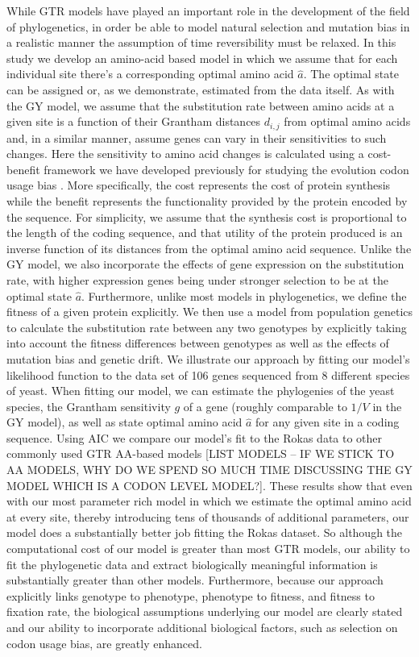 \documentclass[13pt]{article}
\begin{document}
While GTR models have played an important role in the development of the field of phylogenetics,  in order be able to model natural selection and mutation bias in a realistic manner the assumption of time reversibility must be relaxed.
In this study we develop an amino-acid based model in which we assume that for each individual site there's a corresponding optimal amino acid $\hat{a}$.
The optimal state can be assigned or, as we demonstrate, estimated from the data itself.
As with the GY model, we assume that the substitution rate between amino acids at a given site is a function of their Grantham distances $d_{i,j}$ from optimal amino acids and, in a similar manner, assume genes can vary in their sensitivities to such changes.
Here the sensitivity to amino acid changes is calculated using a cost-benefit framework we have developed previously for studying the evolution codon usage bias \cite{Gilchrist07, GilchristEtAl09,ShahAndGilchrist11}.
More specifically, the cost represents the cost of protein synthesis while the benefit represents the functionality provided by the protein encoded by the sequence.
For simplicity, we assume that the synthesis cost is proportional to the length of the coding sequence, and that utility of the protein produced is an inverse function of its distances from the optimal amino acid sequence.
Unlike the GY model, we also incorporate the effects of gene expression on the substitution rate, with higher expression genes being under stronger selection to be at the optimal state $\hat{a}$.
Furthermore, unlike most models in phylogenetics, we define the fitness of a given protein explicitly.
We then use a model from population genetics to calculate the substitution rate between any two genotypes by explicitly taking into account the fitness differences between genotypes as well as the effects of mutation bias and genetic drift.
We illustrate our approach by fitting our model's likelihood function to the \cite{RokasEtAl03} data set of 106 genes sequenced from 8 different species of yeast.
When fitting our model, we can estimate the phylogenies of the yeast species, the Grantham sensitivity $g$ of a gene (roughly comparable to $1/V$ in the GY model), as well as state optimal amino acid $\hat{a}$ for any given site in a coding sequence.
Using AIC we compare our model's fit to the Rokas data to other commonly used GTR AA-based models [LIST MODELS -- IF WE STICK TO AA MODELS, WHY DO WE SPEND SO MUCH TIME DISCUSSING THE GY MODEL WHICH IS A CODON LEVEL MODEL?].
These results show that even with our most parameter rich model in which we estimate the optimal amino acid at every site, thereby introducing tens of thousands of additional parameters, our model does a substantially better job fitting the Rokas dataset.
So although the computational cost of our model is greater than most GTR models,  our ability to fit the phylogenetic data and extract biologically meaningful information is substantially greater than other models.
Furthermore, because our approach explicitly links genotype to phenotype, phenotype to fitness, and fitness to fixation rate, the biological assumptions underlying our model are clearly stated and our ability to incorporate additional biological factors, such as selection on codon usage bias, are greatly enhanced.
 
\end{document}
